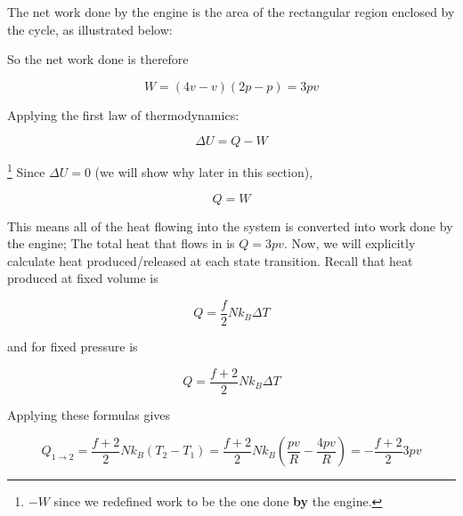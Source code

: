 \documentclass[12pt, a4paper]{article}
\begin{document}
The net work done by the engine is the area of the rectangular region enclosed by the cycle, as illustrated below:

\begin{center}
\end{center}

So the net work done is therefore

\[W=(4v-v)(2p-p)=3pv\]

Applying the first law of thermodynamics:

\[\Delta U=Q-W\]

\footnote{$-W$ since we redefined work to be the one done \textbf{by} the engine.} Since $\Delta U=0$ (we will show why later in this section),

\[Q=W\]

This means all of the heat flowing into the system is converted into work done by the engine; The total heat that flows in is $Q=3pv$. Now, we will explicitly calculate heat produced/released at each state transition. Recall that heat produced at fixed volume is

\[Q=\frac{f}{2} Nk_B\Delta T\]

and for fixed pressure is

\[Q=\frac{f+2}{2} Nk_B\Delta T\]

Applying these formulas gives

\[Q_{1\to2}=\frac{f+2}{2} Nk_B(T_2-T_1)=\frac{f+2}{2} Nk_B\left(\frac{pv}{R}-\frac{4pv}{R}\right)=-\frac{f+2}{2} 3pv\]
\end{document}
